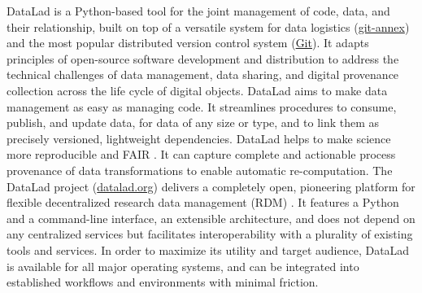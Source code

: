 \begin{chapterabstract}
%
DataLad is a Python-based tool for the joint management of code, data, and
their relationship, built on top of a versatile system for data logistics
(\href{https://git-annex.branchable.com}{\url{git-annex}}) and the most popular
distributed version control system (\href{https://git-scm.com}{\url{Git}}).
%
It adapts principles of open-source software development and distribution to
address the technical challenges of data management, data sharing, and digital
provenance collection across the life cycle of digital objects.
%
DataLad aims to make data management as easy as managing code. It streamlines
procedures to consume, publish, and update data, for data of any size or type,
and to link them as precisely versioned, lightweight dependencies.
%
DataLad helps to make science more reproducible and FAIR
\citep{wilkinson2016fair}.
%
It can capture complete and actionable process provenance of data
transformations to enable automatic re-computation.
%
The DataLad project (\href{http://datalad.org}{\url{datalad.org}}) delivers a
completely open, pioneering platform for flexible decentralized research data
management (RDM) \citep{hanke2021defense}.
%
It features a Python and a command-line interface, an extensible architecture,
and does not depend on any centralized services but facilitates
interoperability with a plurality of existing tools and services.
%
In order to maximize its utility and target audience, DataLad is available for
all major operating systems, and can be integrated into established workflows
and environments with minimal friction.
%
\end{chapterabstract}
